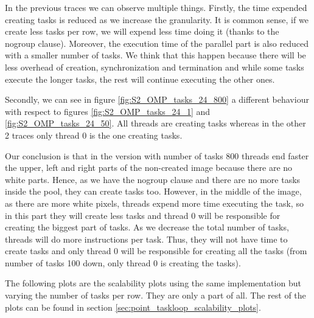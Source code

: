 \documentclass[12pt, a4paper]{article}
\begin{document}
In the previous traces we can observe multiple things. Firstly, the time expended creating tasks is reduced as we increase the granularity. It is common sense, if we create less tasks per row, we will expend less time doing it (thanks to the nogroup clause). Moreover, the execution time of the parallel part is also reduced with a smaller number of tasks. We think that this happen because there will be less overhead of creation, synchronization and termination and while some tasks execute the longer tasks, the rest will continue executing the other ones.

Secondly, we can see in figure \ref{fig:S2_OMP_tasks_24_800} a different behaviour with respect to figures \ref{fig:S2_OMP_tasks_24_1} and \ref{fig:S2_OMP_tasks_24_50}. All threads are creating tasks whereas in the other 2 traces only thread 0 is the one creating tasks.

Our conclusion is that in the version with number of tasks 800 threads end faster the upper, left and right parts of the non-created image because there are no white parts. Hence, as we have the nogroup clause and there are no more tasks inside the pool, they can create tasks too. However, in the middle of the image, as there are more white pixels, threads expend more time executing the task, so in this part they will create less tasks and thread 0 will be responsible for creating the biggest part of tasks. As we decrease the total number of tasks, threads will do more instructions per task. Thus, they will not have time to create tasks and only thread 0 will be responsible for creating all the tasks (from number of tasks 100 down, only thread 0 is creating the tasks).

The following plots are the scalability plots using the same implementation but varying the number of tasks per row. They are only a part of all. The rest of the plots can be found in section \ref{sec:point_taskloop_scalability_plots}.
\end{document}

